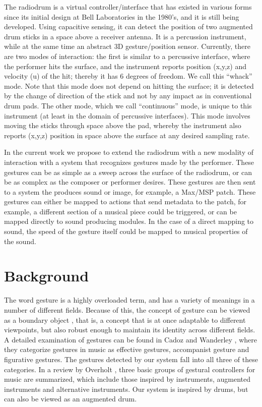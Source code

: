 \documentclass[twoside,10pt,a4paper]{article}
\begin{document}
The radiodrum \cite{schloss89} \cite{tindale05} is a virtual
controller/interface that has existed in various forms since its
initial design at Bell Laboratories in the 1980's, and it is still
being developed.  Using capacitive sensing, it can detect the position
of two augmented drum sticks in a space above a receiver antenna.  It
is a percussion instrument, while at the same time an abstract 3D
gesture/position sensor.  Currently, there are two modes of
interaction: the first is similar to a percussive interface, where the
performer hits the surface, and the instrument reports position (x,y,z)
and velocity (u) of the hit; thereby it has 6 degrees of freedom.  We
call this ``whack'' mode.  Note that this mode does not depend on
hitting the surface; it is detected by the change of direction of the
stick and not by any impact as in conventional drum pads.  The other
mode, which we call ``continuous'' mode, is unique to this instrument
(at least in the domain of percussive interfaces).  This mode involves
moving the sticks through space above the pad, whereby the instrument
also reports (x,y,z) position in space above the surface at any
desired sampling rate.

In the current work we propose to extend the radiodrum with a new
modality of interaction with a system that recognizes gestures made by
the performer.  These gestures can be as simple as a sweep across the
surface of the radiodrum, or can be as complex as the composer or
performer desires.  These gestures are then sent to a system the
produces sound or image, for example, a Max/MSP \cite{puckette02}
patch.  These gestures can either be mapped to actions that send
metadata to the patch, for example, a different section of a musical
piece could be triggered, or can be mapped directly to sound producing
modules.  In the case of a direct mapping to sound, the speed of the
gesture itself could be mapped to musical properties of the sound.

\section{Background}

The word gesture is a highly overloaded term, and has a variety of
meanings in a number of different fields.  Because of this, the
concept of gesture can be viewed as a boundary object \cite{star89},
that is, a concept that is at once adaptable to different viewpoints,
but also robust enough to maintain its identity across different
fields.  A detailed examination of gestures can be found in Cadoz and
Wanderley \cite{cadoz00}, where they categorize gestures in music as
effective gestures, accompanist gesture and figurative gestures.  The
gestures detected by our system fall into all three of these
categories.  In a review by Overholt \cite{overholt07}, three basic
groups of gestural controllers for music are summarized, which include
those inspired by instruments, augmented instruments and alternative
instruments.  Our system is inspired by drums, but can also be viewed
as an augmented drum.
\end{document}
